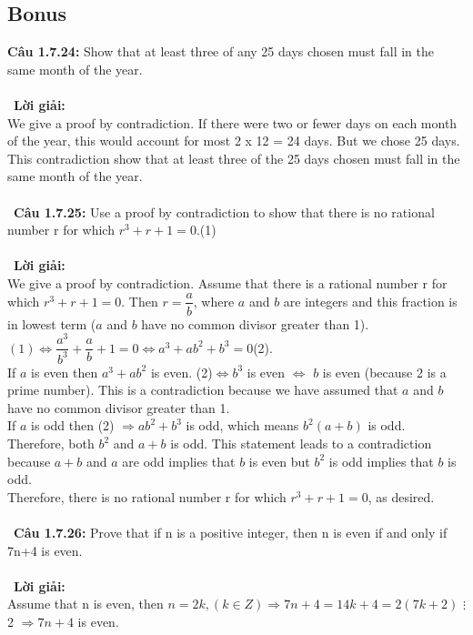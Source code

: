 \documentclass[a4paper]{article}
\begin{document}
\subsection{Bonus}
\textbf{Câu 1.7.24: } Show that at least three of any 25 days chosen must fall in the same month of the year. \\\ \\\
\textbf{Lời giải: } \\ We give a proof by contradiction. If there were two or fewer days on each month of the year, this would account for most 2 x 12 = 24 days. But we chose 25 days. This contradiction show that at least three of the 25 days chosen must fall in the same month of the year. \\\ \\\
\textbf{Câu 1.7.25: } Use a proof by contradiction to show that there is no rational number r for which $r^{3}+r+1=0$.(1) \\\ \\\
\textbf{Lời giải: } \\ We give a proof by contradiction. Assume that there is a rational number r for which $r^{3}+r+1=0$. Then $r=\dfrac{a}{b}$, where $a$ and $b$ are integers and this fraction is in lowest term ($a$ and $b$ have no common divisor greater than 1).\\
$(1) \Leftrightarrow \dfrac{a^{3}}{b^{3}}+\dfrac{a}{b}+1=0 \Leftrightarrow a^{3}+ab^{2}+b^{3}=0$(2).
\\ If $a$ is even then $a^{3}+ab^{2}$ is even. (2)$\Leftrightarrow b^{3}$ is even $\Leftrightarrow$ $b$ is even (because 2 is a prime number). This is a contradiction because we have assumed that $a$ and $b$ have no common divisor greater than 1.
\\ If $a$ is odd then (2) $\Rightarrow ab^{2}+b^{3}$ is odd, which means $b^{2}(a+b)$ is odd. Therefore, both $b^{2}$ and $a+b$ is odd. This statement leads to a contradiction because $a+b$ and $a$ are odd implies that $b$ is even but $b^{2}$ is odd implies that $b$ is odd.
\\ Therefore, there is no rational number r for which  $r^{3}+r+1=0$, as desired.  \\\ \\\
\textbf{Câu 1.7.26: } Prove that if n is a positive integer, then n is even if and only if 7n+4 is even. \\\ \\\
\textbf{Lời giải: } \\ Assume that n is even, then $n=2k, (k \in Z) \Rightarrow 7n+4=14k+4=2(7k+2)$  $\vdots$ 2 $\Rightarrow 7n+4$ is even.
\end{document}
